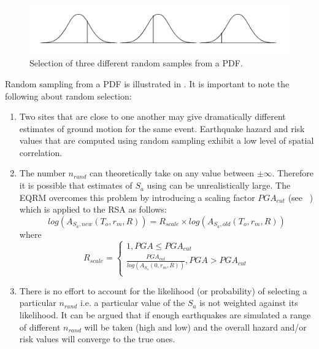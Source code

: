 \begin{figure}
\includegraphics[width=1\textwidth]{diags/fig-hattn-random.pdf}
\caption{Selection of three different random samples from a PDF.}
\label{fig:hattn-randomsamp}
\end{figure}
Random sampling from a PDF is illustrated in
. It is important to note the following
about random selection:
\begin{enumerate}
\item Two sites that are close to one another may give
dramatically different estimates of ground motion for the same
event. Earthquake hazard and risk values that are computed using
random sampling exhibit a low level of spatial correlation.
\item
The number $n_{rand}$ can theoretically take on any value between
$\pm \infty$. Therefore it is possible that estimates of $S_a$ using
 can be unrealistically large. The EQRM
overcomes this problem by introducing a scaling factor $PGA_{cut}$
(see ~) which is applied to the RSA as
follows:
\begin{equation}
 log(A_{S_a,new}(T_o,r_m,R)) = R_{scale} \times
log(A_{S_a,old}(T_o,r_m,R))
\end{equation}
where
\begin{equation}\label{rw}
R_{scale}  =
\begin{cases}
1,  PGA \leq PGA_{cut}\\
\frac{PGA_{cut}}{log(A_{S_a}(0,r_m,R))},
PGA > PGA_{cut}\\
\end{cases}
\end{equation}

\item There is no effort to account for the likelihood (or
probability) of selecting a particular $n_{rand}$ i.e. a particular
value of the $S_a$ is not weighted against its likelihood. It can be
argued that if enough earthquakes are simulated a range of different
$n_{rand}$ will be taken (high and low) and the overall hazard
and/or risk values will converge to the true ones.
\end{enumerate}


